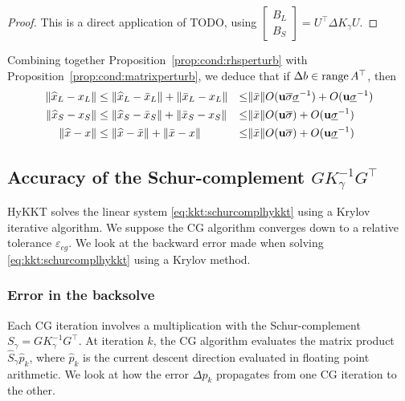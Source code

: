 \begin{proof}
  This is a direct application of TODO, using $\begin{bmatrix} B_L \\ B_S
  \end{bmatrix} = U^\top \Delta K_\gamma U$.
\end{proof}

Combining together Proposition~\ref{prop:cond:rhsperturb}
with Proposition~\ref{prop:cond:matrixperturb}, we deduce that
if $\Delta b \in \operatorname{range}{A^\top}$, then
\begin{equation}
  \begin{aligned}
    \| \widehat{x}_L - x_L  \| & \leq \|\widehat{x}_L - \bar{x}_L \|  + \|\bar{x}_L - x_L \|
    & \leq& \| \bar{x} \| O(\mathbf{u}\overline{\sigma} \underline{\sigma}^{-1}) + O(\mathbf{u} \underline{\sigma}^{-1}) \\
    \| \widehat{x}_S - x_S  \| & \leq \|\widehat{x}_S - \bar{x}_S \|  + \|\bar{x}_S - x_S \|
    & \leq& \| \bar{x} \| O(\mathbf{u}\overline{\sigma}) + O(\mathbf{u} \underline{\sigma}^{-1}) \\
    \| \widehat{x} - x  \| & \leq \|\widehat{x} - \bar{x} \|  + \|\bar{x}- x \|
        & \leq& \| \bar{x} \| O(\mathbf{u}\overline{\sigma}) + O(\mathbf{u} \underline{\sigma}^{-1})
  \end{aligned}
\end{equation}





\subsection{Accuracy of the Schur-complement $G K_\gamma^{-1} G^\top$}
HyKKT solves the linear system \eqref{eq:kkt:schurcomplhykkt}
using a Krylov iterative algorithm. We suppose the CG algorithm converges
down to a relative tolerance $\varepsilon_{cg}$. We look at the backward
error made when solving \eqref{eq:kkt:schurcomplhykkt} using a Krylov method.

\subsubsection{Error in the backsolve}
Each CG iteration
involves a multiplication with the Schur-complement $S_\gamma = G K^{-1}_\gamma G^\top$.
At iteration $k$, the CG algorithm evaluates the matrix product $\widehat{S}_\gamma \widehat{p}_k$,
where $\widehat{p}_k$ is the current descent direction evaluated in
floating point arithmetic. We look at how the error $\Delta p_k$ propagates
from one CG iteration to the other.

